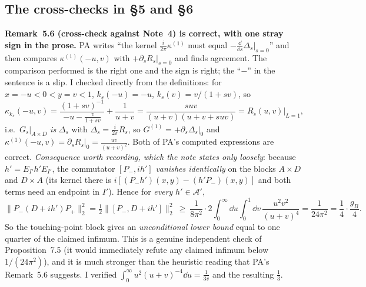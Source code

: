 \documentclass[11pt]{article}
\newcommand{\Pp}{P_+}\newcommand{\Pm}{P_-}
\providecommand{\norm}[1]{\lVert #1\rVert}\providecommand{\abs}[1]{\lvert #1\rvert}
\begin{document}
\subsection{The cross-checks in \S5 and \S6}
\textbf{Remark~5.6 (cross-check against Note~4) is correct, with one stray sign in the prose.}  PA
writes ``the kernel $\frac i{2\pi}\kappa^{(1)}$ must equal $-\frac{\dd}{\dd s}\Delta_s|_{s=0}$'' and
then compares $\kappa^{(1)}(-u,v)$ with $+\partial_sR_s|_{s=0}$ and finds agreement.  The comparison
performed is the right one and the sign is right; the ``$-$'' in the sentence is a slip.  I checked
directly from the definitions: for $x=-u<0<y=v<1$, $k_s(-u)=-u$, $k_s(v)=v/(1+sv)$, so
\[
 \kappa_{k_s}(-u,v)=\frac{(1+sv)^{-1}}{-u-\frac v{1+sv}}+\frac1{u+v}
 =\frac{suv}{(u+v)(u+v+suv)}=R_s(u,v)\big|_{L=1},
\]
i.e.\ $G_s|_{A\times D}$ \emph{is} $\Delta_s$ with $\Delta_s=\frac i{2\pi}R_s$, so
$G^{(1)}=+\partial_s\Delta_s|_0$ and $\kappa^{(1)}(-u,v)=\partial_sR_s|_0=\frac{uv}{(u+v)^2}$.  Both
of PA's computed expressions are correct.
\emph{Consequence worth recording, which the note states only loosely}: because
$h'=E_{I'}h'E_{I'}$, the commutator $[\Pm,ih']$ \emph{vanishes identically} on the blocks
$A\times D$ and $D\times A$ (its kernel there is $i[(\Pm h')(x,y)-(h'\Pm)(x,y)]$ and both terms need
an endpoint in $I'$).  Hence for \emph{every} $h'\in\mathcal A'$,
\[
 \norm{\Pm(D+ih')\Pp}_2^2=\tfrac12\norm{[\Pm,D+ih']}_2^2
 \ \ge\ \frac1{8\pi^2}\cdot2\!\!\int_0^\infty\!\!\!\dd u\!\int_0^1\!\!\dd v\,\frac{u^2v^2}{(u+v)^4}
 =\frac1{24\pi^2}=\frac14\cdot\frac{g_B}4 .
\]
So the touching-point block gives an \emph{unconditional lower bound} equal to one quarter of the
claimed infimum.  This is a genuine independent check of Proposition~7.5 (it would immediately
refute any claimed infimum below $1/(24\pi^2)$), and it is much stronger than the heuristic reading
that PA's Remark~5.6 suggests.  I verified $\int_0^\infty u^2(u+v)^{-4}\dd u=\frac1{3v}$ and the
resulting $\frac13$.
\end{document}
